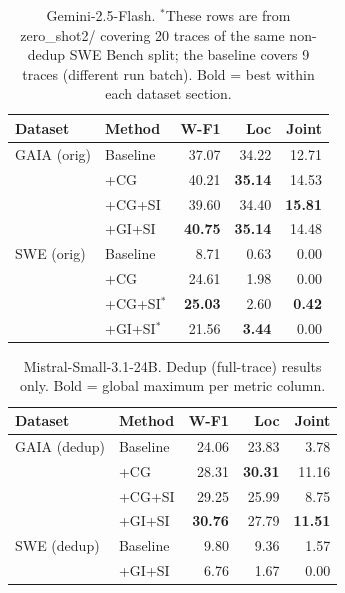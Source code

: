 \begin{table}[h]
\centering\small
\begin{tabular}{ll rrr}
\toprule
\textbf{Dataset} & \textbf{Method} & \textbf{W-F1} & \textbf{Loc} & \textbf{Joint} \\
\midrule
GAIA (orig) & Baseline  & 37.07 & 34.22 & 12.71 \\
            & +CG       & 40.21 & \textbf{35.14} & 14.53 \\
            & +CG+SI    & 39.60 & 34.40 & \textbf{15.81} \\
            & +GI+SI    & \textbf{40.75} & \textbf{35.14} & 14.48 \\
\midrule
SWE (orig)  & Baseline  &  8.71 &  0.63 &  0.00 \\
            & +CG       & 24.61 &  1.98 &  0.00 \\
            & +CG+SI$^*$ & \textbf{25.03} &  2.60 & \textbf{0.42} \\
            & +GI+SI$^*$ & 21.56 & \textbf{3.44} &  0.00 \\
\bottomrule
\end{tabular}
\caption{Gemini-2.5-Flash. $^*$These rows are from zero\_shot2/ covering 20 traces
  of the same non-dedup SWE Bench split; the baseline covers 9 traces (different run batch).
  Bold = best within each dataset section.}
\end{table}


\begin{table}[h]
\centering\small
\begin{tabular}{ll rrr}
\toprule
\textbf{Dataset} & \textbf{Method} & \textbf{W-F1} & \textbf{Loc} & \textbf{Joint} \\
\midrule
GAIA (dedup)  & Baseline  & 24.06 & 23.83 &  3.78 \\
              & +CG       & 28.31 & \textbf{30.31} & 11.16 \\
              & +CG+SI    & 29.25 & 25.99 &  8.75 \\
              & +GI+SI    & \textbf{30.76} & 27.79 & \textbf{11.51} \\
\midrule
SWE (dedup)   & Baseline  &  9.80 &  9.36 &  1.57 \\
              & +GI+SI    &  6.76 &  1.67 &  0.00 \\
\bottomrule
\end{tabular}
\caption{Mistral-Small-3.1-24B. Dedup (full-trace) results only.
  Bold = global maximum per metric column.}
\end{table}


